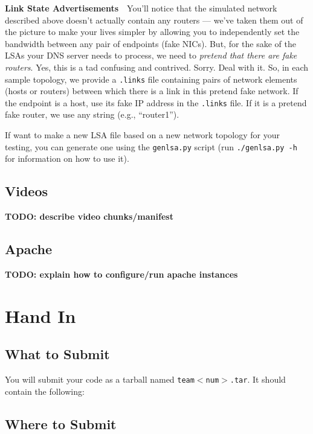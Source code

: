 \documentclass{article}
\begin{document}
\medskip \noindent \textbf{Link State Advertisements}~~You'll notice that the
simulated network described above doesn't actually contain any routers ---
we've taken them out of the picture to make your lives simpler by allowing you
to independently set the bandwidth between any pair of endpoints (fake NICs).
But, for the sake of the LSAs your DNS server needs to process, we need to
\emph{pretend that there are fake routers}. Yes, this is a tad confusing and
contrived. Sorry. Deal with it. So, in each sample topology, we provide a
\texttt{.links} file containing pairs of network elements (hosts or routers)
between which there is a link in this pretend fake network. If the endpoint is
a host, use its fake IP address in the \texttt{.links} file. If it is a pretend
fake router, we use any string (e.g., ``router1'').

If want to make a new LSA file based on a new network topology for your
testing, you can generate one using the \texttt{genlsa.py} script (run
\texttt{./genlsa.py -h} for information on how to use it).





\subsection{Videos}
\label{sec:videos}

\textbf{TODO: describe video chunks/manifest}



\subsection{Apache}
\label{sec:apache}

\textbf{TODO: explain how to configure/run apache instances}




\section{Hand In}

\subsection{What to Submit}

You will submit your code as a tarball named \texttt{team$<$num$>$.tar}. It
should contain the following:


\subsection{Where to Submit}
\end{document}

